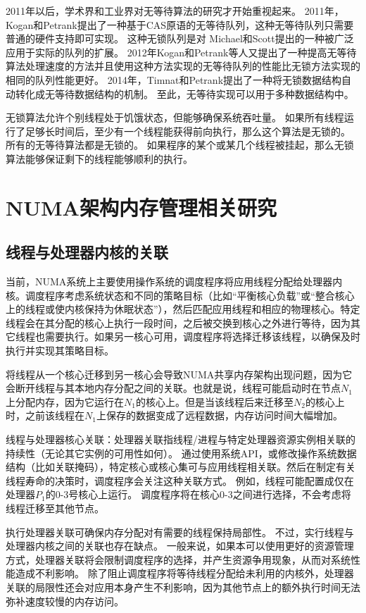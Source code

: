 2011年以后，学术界和工业界对无等待算法的研究才开始重视起来。
2011年，Kogan和Petrank提出了一种基于CAS原语的无等待队列\cite{kogan2011wait}，这种无等待队列只需要普通的硬件支持即可实现。
这种无锁队列是对 Michael和Scott\cite{michael1996simple}提出的一种被广泛应用于实际的队列的扩展。
2012年Kogan和Petrank\cite{kogan2012methodology}等人又提出了一种提高无等待算法处理速度的方法并且使用这种方法实现的无等待队列的性能比无锁方法实现的相同的队列性能更好。
2014年，Timnat和Petrank\cite{timnat2014practical}提出了一种将无锁数据结构自动转化成无等待数据结构的机制。
至此，无等待实现可以用于多种数据结构中。

无锁算法允许个别线程处于饥饿状态，但能够确保系统吞吐量。
如果所有线程运行了足够长时间后，至少有一个线程能获得前向执行，那么这个算法是无锁的。
所有的无等待算法都是无锁的。
如果程序的某个或某几个线程被挂起，那么无锁算法能够保证剩下的线程能够顺利的执行。

\section{NUMA架构内存管理相关研究}

\subsection{线程与处理器内核的关联}
当前，NUMA系统上主要使用操作系统的调度程序将应用线程分配给处理器内核。调度程序考虑系统状态和不同的策略目标（比如“平衡核心负载”或“整合核心上的线程或使内核保持为休眠状态”），然后匹配应用线程和相应的物理核心。特定线程会在其分配的核心上执行一段时间，之后被交换到核心之外进行等待，因为其它线程也需要执行。如果另一核心可用，调度程序将选择迁移该线程，以确保及时执行并实现其策略目标。

将线程从一个核心迁移到另一核心会导致NUMA共享内存架构出现问题，因为它会断开线程与其本地内存分配之间的关联。也就是说，线程可能启动时在节点$N_1$上分配内存，因为它运行在$N_1$的核心上。但是当该线程后来迁移至$N_2$的核心上时，之前该线程在$N_1$上保存的数据变成了远程数据，内存访问时间大幅增加。

线程与处理器核心关联：处理器关联指线程/进程与特定处理器资源实例相关联的持续性（无论其它实例的可用性如何）。 
通过使用系统API，或修改操作系统数据结构（比如关联掩码），特定核心或核心集可与应用线程相关联。然后在制定有关线程寿命的决策时，调度程序会关注这种关联方式。 
例如，线程可能配置成仅在处理器$P_1$的0-3号核心上运行。 
调度程序将在核心0-3之间进行选择，不会考虑将线程迁移至其他节点。

执行处理器关联可确保内存分配对有需要的线程保持局部性。 
不过，实行线程与处理器内核之间的关联也存在缺点。 
一般来说，如果本可以使用更好的资源管理方式，处理器关联将会限制调度程序的选择，并产生资源争用现象，从而对系统性能造成不利影响。 
除了阻止调度程序将等待线程分配给未利用的内核外，处理器关联的局限性还会对应用本身产生不利影响，因为其他节点上的额外执行时间无法弥补速度较慢的内存访问。

